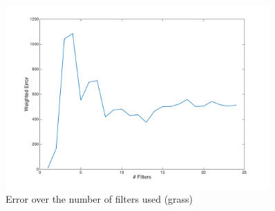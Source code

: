 \documentclass[11pt, oneside]{article}   	%
\begin{document}
\begin{figure}[H]
	\centering
	\includegraphics[width=0.9\textwidth]{grass}
	\caption{Error over the number of filters used (grass)}
	\label {fig:grass}
\end{figure}
\end{document}

